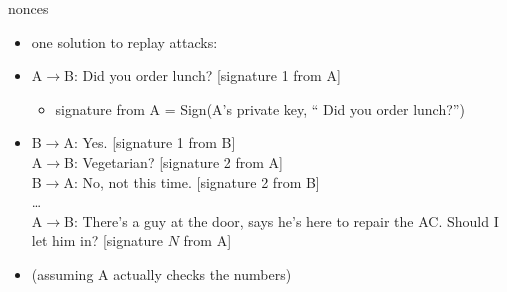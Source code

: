 \begin{frame}{nonces}
    \begin{itemize}
    \item one solution to replay attacks:
    \item A$\rightarrow$B:  Did you order lunch? [signature 1 from A]
        \begin{itemize}
        \item signature from A = Sign(A's private key, `` Did you order lunch?'')
        \end{itemize}
    \item B$\rightarrow$A:  Yes. [signature 1 from B] \\
    A$\rightarrow$B:  Vegetarian? [signature 2 from A] \\
    B$\rightarrow$A:  No, not this time. [signature 2 from B] \\
    \ldots \\
    A$\rightarrow$B:  There's a guy at the door, says he's here to repair the AC. Should I let him in? [signature $N$ from A] \\
    \vspace{.5cm}
    \item (assuming A actually checks the numbers)
    \end{itemize}
\end{frame}


